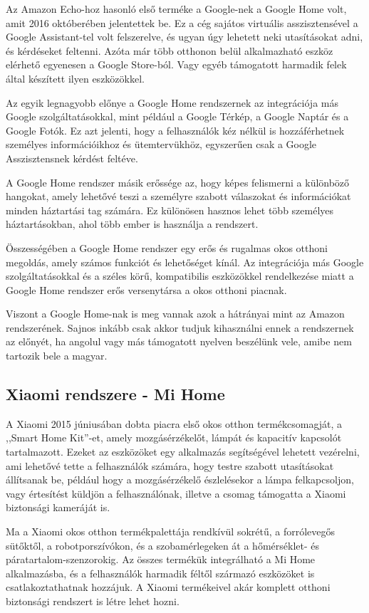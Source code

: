 \documentclass[
]{thesis-ekf}
\theoremstyle{definition}
\theoremstyle{remark}
\begin{document}
	Az Amazon Echo-hoz hasonló első terméke a Google-nek a Google Home volt, amit 2016 októberében jelentettek be. Ez a cég sajátos virtuális asszisztensével a Google Assistant-tel volt felszerelve, és ugyan úgy lehetett neki utasításokat adni, és kérdéseket feltenni. Azóta már több otthonon belül alkalmazható eszköz elérhető egyenesen a Google Store-ból. Vagy egyéb támogatott harmadik felek által készített ilyen eszközökkel.
	
	Az egyik legnagyobb előnye a Google Home rendszernek az integrációja más Google szolgáltatásokkal, mint például a Google Térkép, a Google Naptár és a Google Fotók. Ez azt jelenti, hogy a felhasználók kéz nélkül is hozzáférhetnek személyes információikhoz és ütemtervükhöz, egyszerűen csak a Google Asszisztensnek kérdést feltéve.
	
	A Google Home rendszer másik erőssége az, hogy képes felismerni a különböző hangokat, amely lehetővé teszi a személyre szabott válaszokat és információkat minden háztartási tag számára. Ez különösen hasznos lehet több személyes háztartásokban, ahol több ember is használja a rendszert.
	
	Összességében a Google Home rendszer egy erős és rugalmas okos otthoni megoldás, amely számos funkciót és lehetőséget kínál. Az integrációja más Google szolgáltatásokkal és a széles körű, kompatibilis eszközökkel rendelkezése miatt a Google Home rendszer erős versenytársa a okos otthoni piacnak.
	
	Viszont a Google Home-nak is meg vannak azok a hátrányai mint az Amazon rendszerének. Sajnos inkább csak akkor tudjuk kihasználni ennek a rendszernek az előnyét, ha angolul vagy más támogatott nyelven beszélünk vele, amibe nem tartozik bele a magyar.
	
	\subsection{Xiaomi rendszere - Mi Home}
	A Xiaomi 2015 júniusában dobta piacra első okos otthon termékcsomagját, a ,,Smart Home Kit''-et, amely mozgásérzékelőt, lámpát és kapacitív kapcsolót tartalmazott. Ezeket az eszközöket egy alkalmazás segítségével lehetett vezérelni, ami lehetővé tette a felhasználók számára, hogy testre szabott utasításokat állítsanak be, például hogy a mozgásérzékelő észlelésekor a lámpa felkapcsoljon, vagy értesítést küldjön a felhasználónak, illetve a csomag támogatta a Xiaomi biztonsági kameráját is. \cite{xiaomi-home}
	
	Ma a Xiaomi okos otthon termékpalettája rendkívül sokrétű, a forrólevegős sütőktől, a robotporszívókon, és a szobamérlegeken át a hőmérséklet- és páratartalom-szenzorokig. Az összes termékük integrálható a Mi Home alkalmazásba, és a felhasználók harmadik féltől származó eszközöket is csatlakoztathatnak hozzájuk. A Xiaomi termékeivel akár komplett otthoni biztonsági rendszert is létre lehet hozni.
	
\end{document}
